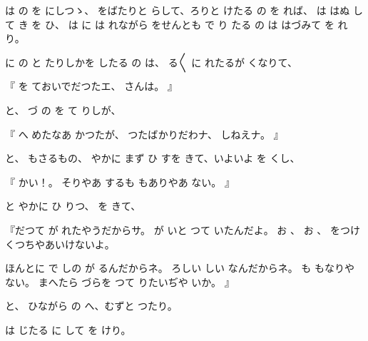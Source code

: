 は
の
を
にしつゝ、
をばたりと
らして、ろりと
けたる
の
を
れば、
は
はぬ
して
き
を
ひ、
は
に
は
れながら
をせんとも
で
り
たる
の
は
はづみて
を
れり。

に
の
と
たりしかを
したる
の
は、
る〳〵
に
れたるが
くなりて、

『
を
ておいでだつたエ、
さんは。
』

と、
づ
の
を
て
りしが、

『
へ
めたなあ
かつたが、
つたばかりだわナ、
しねえナ。
』

と、
もさるもの、
やかに
まず
ひ
すを
きて、いよいよ
を
くし、

『
かい！。
そりやあ
するも
もありやあ
ない。
』

と
やかに
ひ
りつ、
を
きて、

『だつて
が
れたやうだからサ。
が
いと
つて
いたんだよ。
お
、
お
、
をつけ
くつちやあいけないよ。

ほんとに
で
しの
が
るんだからネ。
ろしい
しい
なんだからネ。
も
もなりや
ない。
まへたら
づらを
つて
りたいぢや
いか。
』

と、
ひながら
の
へ、むずと
つたり。

は
じたる
に
して
を
けり。

